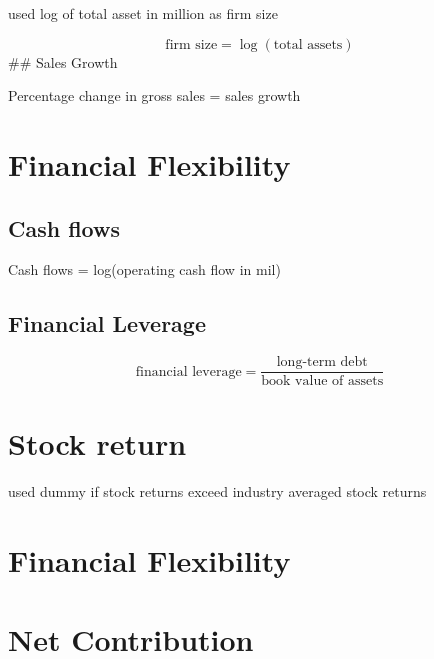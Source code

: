 \documentclass[
]{book}
\begin{document}
\citep{Grewal_2010, McAlister_2016, Nezami_2018} used log of total asset in million as firm size

\[
\text{firm size} = \log (\text{total assets})
\] \#\# Sales Growth \citep{Grewal_2010, Nezami_2018, Rao_2004}

Percentage change in gross sales = sales growth

\hypertarget{financial-flexibility}{%
\section{Financial Flexibility}\label{financial-flexibility}}

\hypertarget{cash-flows}{%
\subsection{Cash flows}\label{cash-flows}}

\citep{Chakravarty_2011, Malshe_2015} Cash flows = log(operating cash flow in mil)

\hypertarget{financial-leverage}{%
\subsection{Financial Leverage}\label{financial-leverage}}

\citep{Kashmiri_2017, Chakravarty_2011}

\[
\text{financial leverage} = \frac{\text{long-term debt}}{\text{book value of assets}}
\]

\hypertarget{stock-return}{%
\section{Stock return}\label{stock-return}}

\citep{Markovitch_2005, Chakravarty_2011, Chakravarty_2016} used dummy if stock returns exceed industry averaged stock
returns

\hypertarget{financial-flexibility-1}{%
\section{Financial Flexibility}\label{financial-flexibility-1}}

\hypertarget{net-contribution}{%
\section{Net Contribution}\label{net-contribution}}
\end{document}
